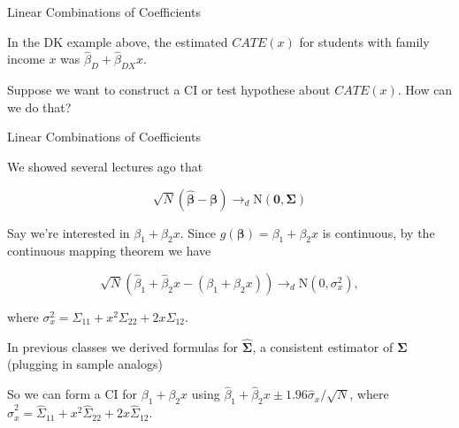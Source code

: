 \documentclass[11pt,english,handout]{beamer}
\newenvironment{wideitemize}{\itemize\addtolength{\itemsep}{10pt}}{\enditemize}
\begin{document}
\begin{frame}{Linear Combinations of Coefficients}
	\begin{wideitemize}
		\item
		In the DK example above, the estimated $CATE(x)$ for students with family income $x$ was $\hat\beta_D+ \hat\beta_{DX} x$.
		
		\pause
		\item
		Suppose we want to construct a CI or test hypothese about $CATE(x)$. How can we do that?
		
	\end{wideitemize}
\end{frame}


\begin{frame}{Linear Combinations of Coefficients}
	\begin{wideitemize}
		\item
		We showed several lectures ago that 
		
		$$\sqrt{N} (\bm{\hat\beta} - \bm\beta ) \rightarrow_d \mathrm{N}(\bm{0}, \bm{\Sigma}) $$
		
		\pause
		\item
		Say we're interested in $\beta_1 + \beta_2 x$. \pause{} Since $g(\bm{\beta}) = \beta_1 + \beta_2x$ is continuous, by the continuous mapping theorem we have \pause{}
		
		$$\sqrt{N}( \hat\beta_1 + \hat\beta_{2} x- ( \beta_1 + \beta_{2} x)) \rightarrow_d \mathrm{N}(0, \sigma_x^2) ,$$
		
		\noindent where $\sigma_x^2 = \Sigma_{11} + x^2 \Sigma_{22} + 2 x \Sigma_{12}$.
		
		
		\pause
		\item
		In previous classes we derived formulas for $\hat{\bm{\Sigma}}$, a consistent estimator of $\bm{\Sigma}$ (plugging in sample analogs) 
				
		\pause
		\item
		So we can form a CI for $\beta_1 + \beta_2 x$ using $\hat\beta_1 + \hat\beta_2 x \pm 1.96 \hat\sigma_x / \sqrt{N}$, where $\hat{\sigma}_x^2 = \hat\Sigma_{11} + x^2 \hat\Sigma_{22} + 2 x   \hat\Sigma_{12}$.
	\end{wideitemize}
\end{frame}
\end{document}
